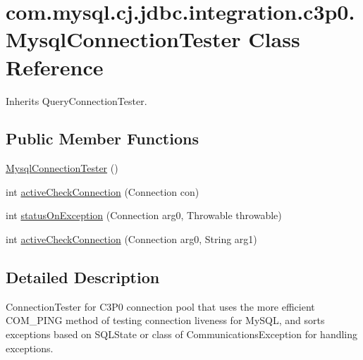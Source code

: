 \hypertarget{classcom_1_1mysql_1_1cj_1_1jdbc_1_1integration_1_1c3p0_1_1_mysql_connection_tester}{}\section{com.\+mysql.\+cj.\+jdbc.\+integration.\+c3p0.\+Mysql\+Connection\+Tester Class Reference}
\label{classcom_1_1mysql_1_1cj_1_1jdbc_1_1integration_1_1c3p0_1_1_mysql_connection_tester}


Inherits Query\+Connection\+Tester.

\subsection*{Public Member Functions}
\begin{DoxyCompactItemize}
\item 
\mbox{\hyperlink{classcom_1_1mysql_1_1cj_1_1jdbc_1_1integration_1_1c3p0_1_1_mysql_connection_tester_a966255b8042794533f615dcf7f2df616}{Mysql\+Connection\+Tester}} ()
\item 
int \mbox{\hyperlink{classcom_1_1mysql_1_1cj_1_1jdbc_1_1integration_1_1c3p0_1_1_mysql_connection_tester_a4a57e4d2b76208bb22e8effb5afe7fbf}{active\+Check\+Connection}} (Connection con)
\item 
int \mbox{\hyperlink{classcom_1_1mysql_1_1cj_1_1jdbc_1_1integration_1_1c3p0_1_1_mysql_connection_tester_ab625c55dddeb0306fe2c65b950c57f00}{status\+On\+Exception}} (Connection arg0, Throwable throwable)
\item 
int \mbox{\hyperlink{classcom_1_1mysql_1_1cj_1_1jdbc_1_1integration_1_1c3p0_1_1_mysql_connection_tester_a7e38707b36013ff97888f67dbac7b9d1}{active\+Check\+Connection}} (Connection arg0, String arg1)
\end{DoxyCompactItemize}


\subsection{Detailed Description}
Connection\+Tester for C3\+P0 connection pool that uses the more efficient C\+O\+M\+\_\+\+P\+I\+NG method of testing connection \textquotesingle{}liveness\textquotesingle{} for My\+S\+QL, and \textquotesingle{}sorts\textquotesingle{} exceptions based on S\+Q\+L\+State or class of \textquotesingle{}Communications\+Exception\textquotesingle{} for handling exceptions. 

